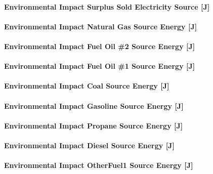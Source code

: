 \paragraph{Environmental Impact Surplus Sold Electricity Source {[}J{]}}\label{environmental-impact-surplus-sold-electricity-source-j}

\paragraph{Environmental Impact Natural Gas Source Energy {[}J{]}}\label{environmental-impact-natural-gas-source-energy-j}

\paragraph{Environmental Impact Fuel Oil \#2 Source Energy {[}J{]}}\label{environmental-impact-fuel-oil-2-source-energy-j}

\paragraph{Environmental Impact Fuel Oil \#1 Source Energy {[}J{]}}\label{environmental-impact-fuel-oil-1-source-energy-j}

\paragraph{Environmental Impact Coal Source Energy {[}J{]}}\label{environmental-impact-coal-source-energy-j}

\paragraph{Environmental Impact Gasoline Source Energy {[}J{]}}\label{environmental-impact-gasoline-source-energy-j}

\paragraph{Environmental Impact Propane Source Energy {[}J{]}}\label{environmental-impact-propane-source-energy-j}

\paragraph{Environmental Impact Diesel Source Energy {[}J{]}}\label{environmental-impact-diesel-source-energy-j}

\paragraph{Environmental Impact OtherFuel1 Source Energy {[}J{]}}\label{environmental-impact-otherfuel1-source-energy-j}

